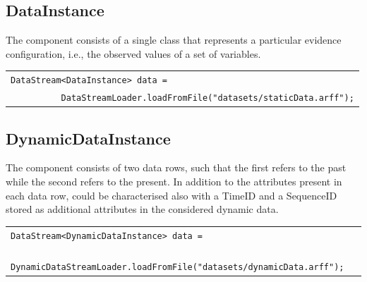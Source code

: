 \subsection{DataInstance}
  
The  component consists of a single class that represents a particular evidence configuration, i.e., the observed values of a set of variables. 

\vspace{-0.1in}
\begin{table}[H]
\begin{tabular}{l} \\ \hline
                \texttt{DataStream<DataInstance> data = }\\
                 \texttt{~~~~~~~~~~DataStreamLoader.loadFromFile("datasets/staticData.arff");}\\\hline 
\end{tabular}
\end{table}

\subsection{DynamicDataInstance}

The  component consists of two data rows, such that the first refers to the past while the second refers to the present. In addition to the attributes present in each data row,  could be characterised also with a TimeID and a SequenceID stored as additional attributes in the considered dynamic data.

\vspace{-0.1in}
\begin{table}[H]
\begin{tabular}{l} \\ \hline
        \texttt{DataStream<DynamicDataInstance> data = }\\
        \texttt{~~~~ DynamicDataStreamLoader.loadFromFile("datasets/dynamicData.arff");}\\\hline 
\end{tabular}
\end{table}


